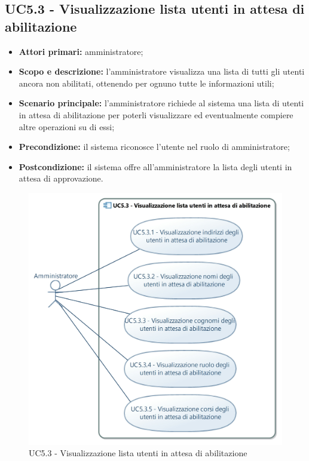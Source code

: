 \documentclass[AnalisiDeiRequisiti.tex]{subfiles}
\begin{document}
\subsection{UC5.3 - Visualizzazione lista utenti in attesa di abilitazione}
\begin{itemize}
	\item \textbf{Attori primari:} amministratore;
	\item \textbf{Scopo e descrizione:} l'amministratore visualizza una lista di tutti gli utenti ancora non abilitati, ottenendo per ognuno tutte le informazioni utili;
	\item \textbf{Scenario principale:} l'amministratore richiede al sistema una lista di utenti in attesa di abilitazione per poterli visualizzare ed eventualmente compiere altre operazioni su di essi;
	\item \textbf{Precondizione:} il sistema riconosce l'utente nel ruolo di amministratore; 
	\item \textbf{Postcondizione:} il sistema offre all'amministratore la lista degli utenti in attesa di approvazione.
\end{itemize}
\begin{figure}[H]
	\centering
	\includegraphics[width=0.9\linewidth]{UC5_3.jpg}
	\caption{UC5.3 - Visualizzazione lista utenti in attesa di abilitazione}
	\label{fig:UC5.3 - Visualizzazione lista utenti in attesa di abilitazione}
\end{figure}
\end{document}
